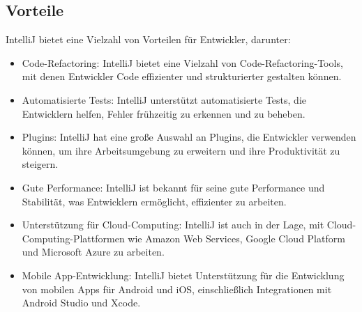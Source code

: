 \subsection{Vorteile}

IntelliJ bietet eine Vielzahl von Vorteilen für Entwickler, darunter:

\begin{itemize}
    \item Code-Refactoring: IntelliJ bietet eine Vielzahl von Code-Refactoring-Tools, mit denen Entwickler Code effizienter und strukturierter gestalten können.
    \item Automatisierte Tests: IntelliJ unterstützt automatisierte Tests, die Entwicklern helfen, Fehler frühzeitig zu erkennen und zu beheben.
    \item Plugins: IntelliJ hat eine große Auswahl an Plugins, die Entwickler verwenden können, um ihre Arbeitsumgebung zu erweitern und ihre Produktivität zu steigern.
    \item Gute Performance: IntelliJ ist bekannt für seine gute Performance und Stabilität, was Entwicklern ermöglicht, effizienter zu arbeiten.
    \item Unterstützung für Cloud-Computing: IntelliJ ist auch in der Lage, mit Cloud-Computing-Plattformen wie Amazon Web Services, Google Cloud Platform und Microsoft Azure zu arbeiten.
    \item Mobile App-Entwicklung: IntelliJ bietet Unterstützung für die Entwicklung von mobilen Apps für Android und iOS, einschließlich Integrationen mit Android Studio und Xcode.
\end{itemize}